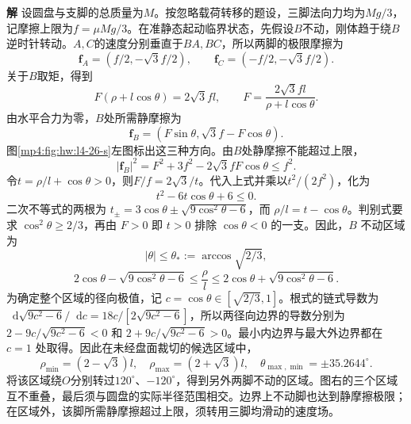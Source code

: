 \documentclass[11pt,openany,fontset=fandol]{ctexbook}
\theoremstyle{definition}\newtheorem{example}{例}[chapter]\newtheorem{exercise}{习题}[chapter]
\newcommand{\SolutionStart}{\par\medskip\ifdim\pagetotal>0pt\ifdim\dimexpr\pagegoal-\pagetotal\relax<3\baselineskip\newpage\fi\fi\noindent\textbf{解}\quad\ignorespaces}
\newenvironment{solution}{\SolutionStart}{\par\medskip}
\newcommand{\dd}{\mathop{}\!\mathrm d}\newcommand{\ee}{\mathrm e}\newcommand{\vct}[1]{\bm{#1}}
\begin{document}
\begin{solution}
设圆盘与支脚的总质量为$M$。按忽略载荷转移的题设，三脚法向力均为$Mg/3$，记摩擦上限为$f=\mu Mg/3$。在准静态起动临界状态，先假设$B$不动，刚体趋于绕$B$逆时针转动。$A,C$的速度分别垂直于$BA,BC$，所以两脚的极限摩擦为
\[
 \vct f_A=(f/2,-\sqrt3f/2),\qquad
 \vct f_C=(-f/2,-\sqrt3f/2).
\]
关于$B$取矩，得到
\[
 F(\rho+l\cos\theta)=2\sqrt3fl,
 \qquad F=\frac{2\sqrt3fl}{\rho+l\cos\theta}.
\]
由水平合力为零，$B$处所需静摩擦为
\[
 \vct f_B=(F\sin\theta,\sqrt3f-F\cos\theta).
\]
图\ref{mp4:fig:hw:l4-26-s}左图标出这三种方向。由$B$处静摩擦不能超过上限，
\[
|\vct f_B|^2=F^2+3f^2-2\sqrt3fF\cos\theta\le f^2.
\]
令$t=\rho/l+\cos\theta>0$，则$F/f=2\sqrt3/t$。代入上式并乘以$t^2/(2f^2)$，化为
\[
 t^2-6t\cos\theta+6\le0.
\]
二次不等式的两根为 $t_\pm=3\cos\theta\pm\sqrt{9\cos^2\theta-6}$，而 $\rho/l=t-\cos\theta$。判别式要求 $\cos^2\theta\ge2/3$，再由 $F>0$ 即 $t>0$ 排除 $\cos\theta<0$ 的一支。因此，$B$ 不动区域为
\[
 \boxed{|\theta|\le\theta_*:=\arccos\sqrt{2/3}},
\]
\[
 \boxed{2\cos\theta-\sqrt{9\cos^2\theta-6}
 \le\frac\rho l\le
 2\cos\theta+\sqrt{9\cos^2\theta-6}}.
\]
为确定整个区域的径向极值，记 $c=\cos\theta\in[\sqrt{2/3},1]$。根式的链式导数为 $\dd\sqrt{9c^2-6}/\dd c=18c/[2\sqrt{9c^2-6}]$，所以两径向边界的导数分别为 $2-9c/\sqrt{9c^2-6}<0$ 和 $2+9c/\sqrt{9c^2-6}>0$。最小内边界与最大外边界都在 $c=1$ 处取得。因此在未经盘面裁切的候选区域中，
\[
 \rho_{\min}=(2-\sqrt3)l,\quad
 \rho_{\max}=(2+\sqrt3)l,\quad
 \theta_{\max,\min}=\pm35.2644^\circ.
\]
将该区域绕$O$分别转过$120^\circ$、$-120^\circ$，得到另外两脚不动的区域。图右的三个区域互不重叠，最后须与圆盘的实际半径范围相交。边界上不动脚也达到静摩擦极限；在区域外，该脚所需静摩擦超过上限，须转用三脚均滑动的速度场。


\begin{figure}[H]\centering
\begin{tikzpicture}[>=Stealth,line cap=round,line join=round]


\end{tikzpicture}
\end{figure}
\end{solution}
\end{document}
